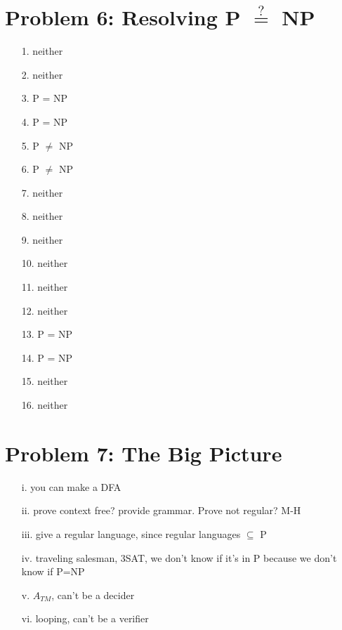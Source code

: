 \documentclass[10pt,letter]{article}
\begin{document}
\section*{Problem 6: Resolving P $\stackrel{?}{=}$ NP}

\begin{enumerate}
\item[1.] neither
\item[2.] neither
\item[3.] P = NP
\item[4.] P = NP
\item[5.] P $\neq$ NP
\item[6.] P $\neq$ NP
\item[7.] neither
\item[8.] neither
\item[9.] neither
\item[10.] neither
\item[11.] neither
\item[12.] neither
\item[13.] P = NP
\item[14.] P = NP
\item[15.] neither
\item[16.] neither
\end{enumerate}

\section*{Problem 7: The Big Picture}
\begin{enumerate}
\item[i.] you can make a DFA
\item[ii.] prove context free? provide grammar. Prove not regular? M-H
\item[iii.] give a regular language, since regular languages $\subseteq$ P
\item[iv.] traveling salesman, 3SAT, we don't know if it's in P because we don't know if P=NP
\item[v.]$A_{TM}$, can't be a decider
\item[vi.]looping, can't be a verifier
\end{enumerate}
\end{document}
